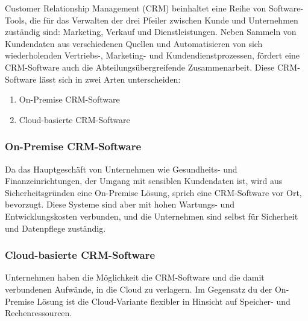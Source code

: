 Customer Relationship Management (CRM) beinhaltet eine Reihe von Software-Tools, die für das Verwalten der drei Pfeiler zwischen Kunde und Unternehmen zuständig sind: Marketing, Verkauf und Dienstleistungen. Neben Sammeln von Kundendaten aus verschiedenen Quellen und Automatisieren von sich wiederholenden Vertriebs-, Marketing- und Kundendienstprozessen, fördert eine CRM-Software auch die Abteilungsübergreifende Zusammenarbeit. Diese CRM-Software lässt sich in zwei Arten unterscheiden:
\begin{enumerate}
    \item On-Premise CRM-Software
    \item Cloud-basierte CRM-Software
\end{enumerate}

\subsubsection{On-Premise CRM-Software}
Da das Hauptgeschäft von Unternehmen wie Gesundheits- und Finanzeinrichtungen, der Umgang mit sensiblen Kundendaten ist, wird aus Sicherheitsgründen eine On-Premise Lösung, sprich eine CRM-Software vor Ort, bevorzugt. Diese Systeme sind aber mit hohen Wartungs- und Entwicklungskosten verbunden, und die Unternehmen sind selbst für Sicherheit und Datenpflege zuständig.

\subsubsection{Cloud-basierte CRM-Software}
Unternehmen haben die Möglichkeit die CRM-Software und die damit verbundenen Aufwände, in die Cloud zu verlagern. Im Gegensatz du der On-Premise Lösung ist die Cloud-Variante flexibler in Hinsicht auf Speicher- und Rechenressourcen.